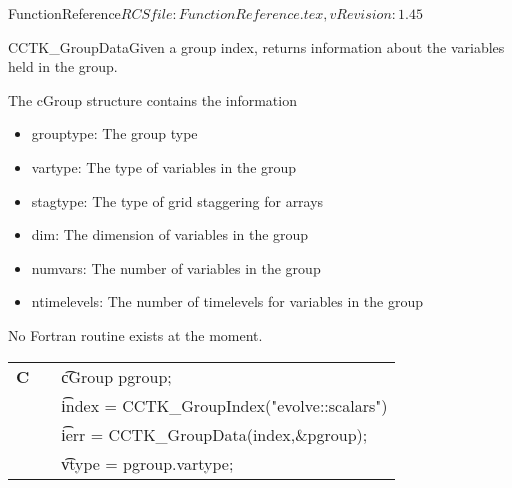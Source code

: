 \begin{cactuspart}{5}{FunctionReference}{$RCSfile: FunctionReference.tex,v $}{$Revision: 1.45 $}
\begin{CCTKFunc}{CCTK\_GroupData}{Given a group index, returns information about the variables held in the group.}
\label{CCTK-GroupData}
\showcargs
\begin{params}
\end{params}
\begin{discussion}
The cGroup structure contains the information
\begin{itemize}
\item grouptype: The group type
\item vartype: The type of variables in the group
\item stagtype: The type of grid staggering for arrays
\item dim: The dimension of variables in the group
\item numvars: The number of variables in the group
\item ntimelevels: The number of timelevels for variables in the group
\end{itemize}
No Fortran routine exists at the moment.
\end{discussion}
\begin{examples}
\begin{tabular}{@{}p{3cm}cp{11cm}}
\hfill {\bf C} && {\t cGroup pgroup;}\\
               && {\t index = CCTK\_GroupIndex("evolve::scalars")}\\
               &&{\t ierr = CCTK\_GroupData(index,\&pgroup);}\\
               && {\t vtype = pgroup.vartype;}
\\
\end{tabular}
\end{examples}
\begin{errorcodes}
\end{errorcodes}
\end{CCTKFunc}




\end{cactuspart}
